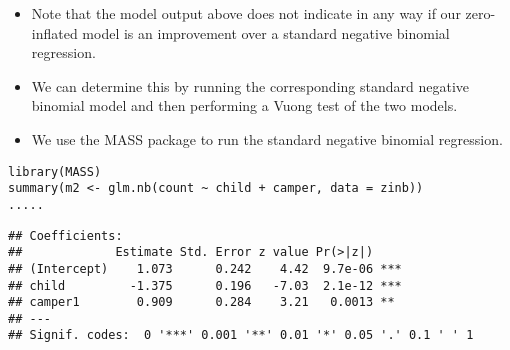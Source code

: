 \documentclass[MASTER.tex]{subfiles}
\begin{document}
 
\begin{frame}
	\begin{itemize}
\item Note that the model output above does not indicate in any way if our zero-inflated model is an improvement over a standard negative binomial regression. 
\item We can determine this by running the corresponding standard negative binomial model and then performing a Vuong test of the two models.
\item We use the MASS package to run the standard negative binomial regression.
	\end{itemize}


\end{frame}
\begin{frame}[fragile]
\begin{verbatim}
library(MASS)
summary(m2 <- glm.nb(count ~ child + camper, data = zinb))
.....
\end{verbatim}
\end{frame}
\begin{frame}[fragile]
\begin{verbatim}
## Coefficients:
##             Estimate Std. Error z value Pr(>|z|)    
## (Intercept)    1.073      0.242    4.42  9.7e-06 ***
## child         -1.375      0.196   -7.03  2.1e-12 ***
## camper1        0.909      0.284    3.21   0.0013 ** 
## ---
## Signif. codes:  0 '***' 0.001 '**' 0.01 '*' 0.05 '.' 0.1 ' ' 1
\end{verbatim}
\end{frame}
\end{document}
